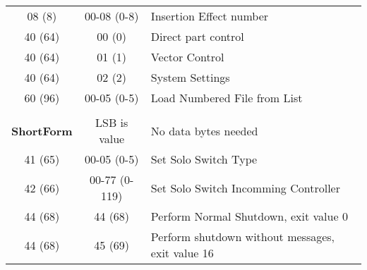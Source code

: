 \begin{table}[H]
\begin{tabular}{c c l}
        08 (8) & 00-08 (0-8)& Insertion Effect number \\
        40 (64) & 00 (0) & Direct part control \\
        40 (64) & 01 (1) & Vector Control \\
        40 (64) & 02 (2) & System Settings \\
        60 (96) & 00-05 (0-5) & Load Numbered File from List \\
        \\
    \textbf{ShortForm} &  LSB is value & No data bytes needed \\
        41 (65) & 00-05 (0-5) & Set Solo Switch Type \\
        42 (66) & 00-77 (0-119) & Set Solo Switch Incomming Controller \\
        44 (68) & 44 (68) & Perform Normal Shutdown, exit value 0 \\
        44 (68) & 45 (69) & Perform shutdown without messages, exit value 16 \\
      \end{tabular}
   \end{table}
\fi



